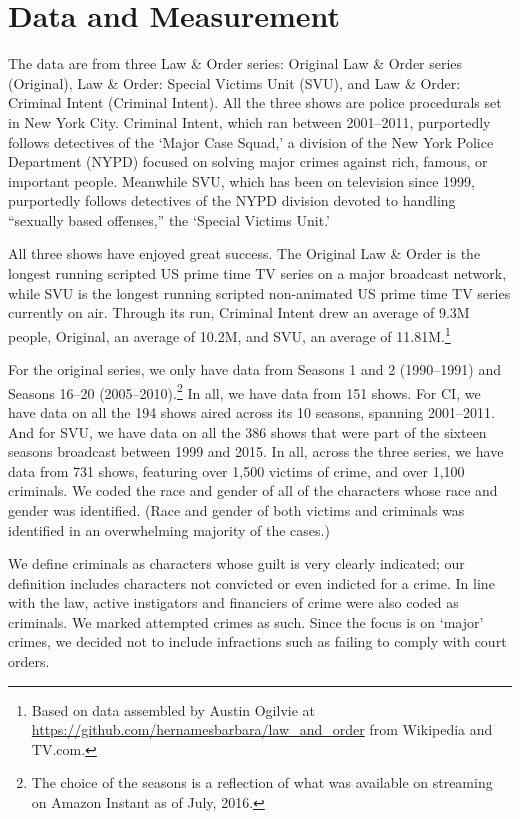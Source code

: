 \documentclass[12pt, letterpaper]{article}
\begin{document}
\section*{Data and Measurement}
The data are from three Law \& Order series: Original Law \& Order series (Original), Law \& Order: Special Victims Unit (SVU), and Law \& Order: Criminal Intent (Criminal Intent). All the three shows are police procedurals set in New York City. Criminal Intent, which ran between 2001--2011, purportedly follows detectives of the `Major Case Squad,' a division of the New York Police Department (NYPD) focused on solving major crimes against rich, famous, or important people. Meanwhile SVU, which has been on television since 1999, purportedly follows detectives of the NYPD division devoted to handling ``sexually based offenses,'' the `Special Victims Unit.'

All three shows have enjoyed great success. The Original Law \& Order is the longest running scripted US prime time TV series on a major broadcast network, while SVU is the longest running scripted non-animated US prime time TV series currently on air. Through its run, Criminal Intent drew an average of 9.3M people, Original, an average of 10.2M, and SVU, an average of 11.81M.\footnote{Based on data assembled by Austin Ogilvie at \href{https://github.com/hernamesbarbara/law_and_order}{https://github.com/hernamesbarbara/law\_and\_order} from Wikipedia and TV.com.}

For the original series, we only have data from Seasons 1 and 2 (1990--1991) and Seasons 16--20 (2005--2010).\footnote{The choice of the seasons is a reflection of what was available on streaming on Amazon Instant as of July, 2016.} In all, we have data from 151 shows. For CI, we have data on all the 194 shows aired across its 10 seasons, spanning 2001--2011. And for SVU, we have data on all the 386 shows that were part of the sixteen seasons broadcast between 1999 and 2015. In all, across the three series, we have data from 731 shows, featuring over 1,500 victims of crime, and over 1,100 criminals. We coded the race and gender of all of the characters whose race and gender was identified. (Race and gender of both victims and criminals was identified in an overwhelming majority of the cases.) 

We define criminals as characters whose guilt is very clearly indicated; our definition includes characters not convicted or even indicted for a crime. In line with the law, active instigators and financiers of crime were also coded as criminals. We marked attempted crimes as such. Since the focus is on `major' crimes, we decided not to include infractions such as failing to comply with court orders. 
\end{document}
